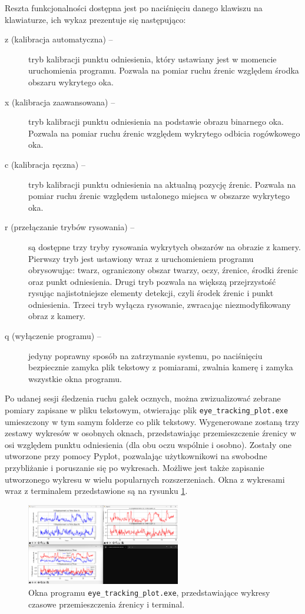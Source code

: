 \documentclass[a4paper,twoside,12pt]{book}
\begin{document}
Reszta funkcjonalności dostępna jest po naciśnięciu danego klawiszu na klawiaturze, ich wykaz prezentuje się następująco:

\begin{description}
	\item[z (kalibracja automatyczna) --] tryb kalibracji punktu odniesienia, który ustawiany jest w momencie uruchomienia programu. Pozwala na pomiar ruchu źrenic względem środka obszaru wykrytego oka.
	\item[x (kalibracja zaawansowana) --] tryb kalibracji punktu odniesienia na podstawie obrazu binarnego oka. Pozwala na pomiar ruchu źrenic względem wykrytego odbicia rogówkowego oka.
	\item[c (kalibracja ręczna) --]  tryb kalibracji punktu odniesienia na aktualną pozycję źrenic. Pozwala na pomiar ruchu źrenic względem ustalonego miejsca w obszarze wykrytego oka.
	\item[r (przełączanie trybów rysowania) --] są dostępne trzy tryby rysowania wykrytych obszarów na obrazie z kamery. Pierwszy tryb jest ustawiony wraz z uruchomieniem programu obrysowując: twarz, ograniczony obszar twarzy, oczy, źrenice, środki źrenic oraz punkt odniesienia. Drugi tryb pozwala na większą przejrzystość rysując najistotniejsze elementy detekcji, czyli środek źrenic i punkt odniesienia. Trzeci tryb wyłącza rysowanie, zwracając niezmodyfikowany obraz z kamery.
	\item[q (wyłączenie programu) --] jedyny poprawny sposób na zatrzymanie systemu, po naciśnięciu bezpiecznie zamyka plik tekstowy z pomiarami, zwalnia kamerę i zamyka wszystkie okna programu.
\end{description}

Po udanej sesji śledzenia ruchu gałek ocznych, można zwizualizować zebrane pomiary zapisane w pliku tekstowym, otwierając plik \texttt{eye\_\-tracking\_\-plot.exe} umieszczony w tym samym folderze co plik tekstowy. Wygenerowane zostaną trzy zestawy wykresów w osobnych oknach, przedstawiając przemieszczenie źrenicy w osi względem punktu odniesienia (dla obu oczu wspólnie i osobno). Zostały one utworzone przy pomocy Pyplot, pozwalając użytkownikowi na swobodne przybliżanie i poruszanie się po wykresach. Możliwe jest także zapisanie utworzonego wykresu w wielu popularnych rozszerzeniach. Okna z wykresami wraz z terminalem przedstawione są na rysunku \ref{fig:eye_tracking_plot-wykresy-i-terminal}.

\begin{figure}[htbp]
	\centering
	\includegraphics[width=0.6\textwidth]{pic/obsługa/wykresy.png}
	\caption{Okna programu \texttt{eye\_\-tracking\_\-plot.exe}, przedstawiające wykresy czasowe przemieszczenia źrenicy i terminal.}
	\label{fig:eye_tracking_plot-wykresy-i-terminal}
\end{figure}
\end{document}
